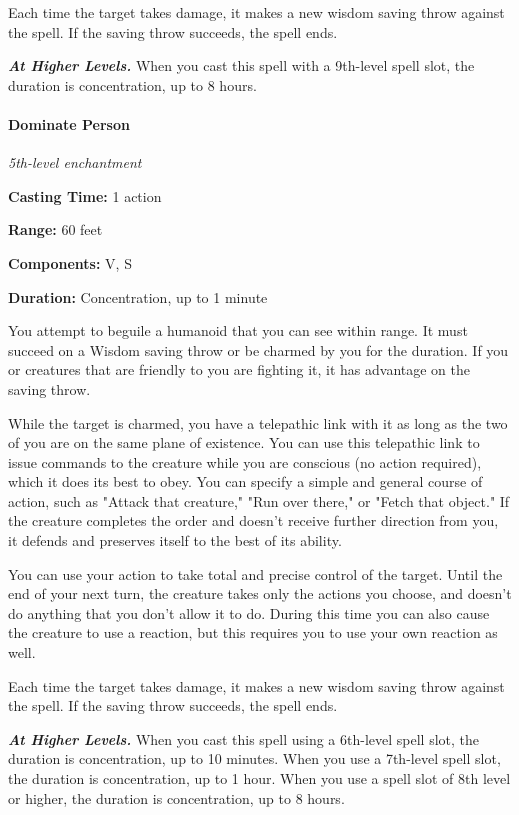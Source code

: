 \documentclass[
]{article}
\begin{document}
Each time the target takes damage, it makes a new wisdom saving throw
against the spell. If the saving throw succeeds, the spell ends.

\emph{\textbf{At Higher Levels.}} When you cast this spell with a
9th-level spell slot, the duration is concentration, up to 8 hours.

\hypertarget{dominate-person}{%
\paragraph{Dominate Person}\label{dominate-person}}

\emph{5th-level enchantment}

\textbf{Casting Time:} 1 action

\textbf{Range:} 60 feet

\textbf{Components:} V, S

\textbf{Duration:} Concentration, up to 1 minute

You attempt to beguile a humanoid that you can see within range. It must
succeed on a Wisdom saving throw or be charmed by you for the duration.
If you or creatures that are friendly to you are fighting it, it has
advantage on the saving throw.

While the target is charmed, you have a telepathic link with it as long
as the two of you are on the same plane of existence. You can use this
telepathic link to issue commands to the creature while you are
conscious (no action required), which it does its best to obey. You can
specify a simple and general course of action, such as "Attack that
creature," "Run over there," or "Fetch that object." If the creature
completes the order and doesn't receive further direction from you, it
defends and preserves itself to the best of its ability.

You can use your action to take total and precise control of the target.
Until the end of your next turn, the creature takes only the actions you
choose, and doesn't do anything that you don't allow it to do. During
this time you can also cause the creature to use a reaction, but this
requires you to use your own reaction as well.

Each time the target takes damage, it makes a new wisdom saving throw
against the spell. If the saving throw succeeds, the spell ends.

\emph{\textbf{At Higher Levels.}} When you cast this spell using a
6th-level spell slot, the duration is concentration, up to 10 minutes.
When you use a 7th-level spell slot, the duration is concentration, up
to 1 hour. When you use a spell slot of 8th level or higher, the
duration is concentration, up to 8 hours.
\end{document}
